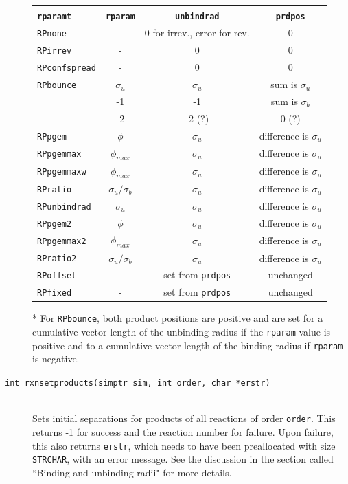 \documentclass {scrbook}
\newcommand {\ttt} {\texttt}
\begin{document}
\begin{description}
\begin{longtable}[c]{lccc}
\ttt{rparamt} & \ttt{rparam} & \ttt{unbindrad} & \ttt{prdpos}\\
\hline
\ttt{RPnone} & - & 0 for irrev., error for rev. & 0\\
\ttt{RPirrev} & - & 0 & 0\\
\ttt{RPconfspread} & - & 0 & 0\\
\ttt{RPbounce} & $\sigma_u$ & $\sigma_u$ & sum is $\sigma_u$\\
 & -1 & -1 & sum is $\sigma_b$\\
 & -2 & -2 (?) & 0 (?)\\
\ttt{RPpgem} & $\phi$ & $\sigma_u$ & difference is $\sigma_u$\\
\ttt{RPpgemmax} & $\phi_{max}$ & $\sigma_u$ & difference is $\sigma_u$\\
\ttt{RPpgemmaxw} & $\phi_{max}$ & $\sigma_u$ & difference is $\sigma_u$\\
\ttt{RPratio} & $\sigma_u/\sigma_b$ & $\sigma_u$ & difference is $\sigma_u$\\
\ttt{RPunbindrad} & $\sigma_u$ & $\sigma_u$ & difference is $\sigma_u$\\
\ttt{RPpgem2} & $\phi$ & $\sigma_u$ & difference is $\sigma_u$\\
\ttt{RPpgemmax2} & $\phi_{max}$ & $\sigma_u$ & difference is $\sigma_u$\\
\ttt{RPratio2} & $\sigma_u/\sigma_b$ & $\sigma_u$ & difference is $\sigma_u$\\
\ttt{RPoffset} & - & set from \ttt{prdpos} & unchanged\\
\ttt{RPfixed} & - & set from \ttt{prdpos} & unchanged\\
\end{longtable}

* For \ttt{RPbounce}, both product positions are positive and are set for a cumulative vector length of the unbinding radius if the \ttt{rparam} value is positive and to a cumulative vector length of the binding radius if \ttt{rparam} is negative.

\item[\ttt{int rxnsetproducts(simptr sim, int order, char *erstr)}]
\hfill \\
Sets initial separations for products of all reactions of order \ttt{order}. This returns -1 for success and the reaction number for failure. Upon failure, this also returns \ttt{erstr}, which needs to have been preallocated with size \ttt{STRCHAR}, with an error message. See the discussion in the section called ``Binding and unbinding radii" for more details.


\end{description}
\end{document}
